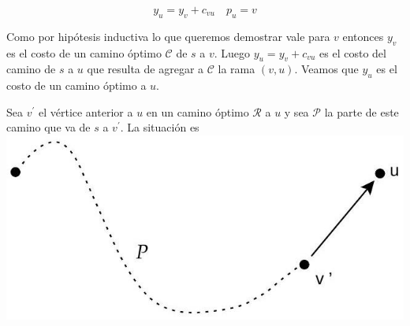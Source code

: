 \documentclass[10pt]{article}
\begin{document}
$$
y_{u}=y_{v}+c_{v u} \quad p_{u}=v
$$

Como por hipótesis inductiva lo que queremos demostrar vale para $v$ entonces $y_{v}$ es el costo de un camino óptimo $\mathcal{C}$ de $s$ a $v$. Luego $y_{u}=y_{v}+c_{v u}$ es el costo del camino de $s$ a $u$ que resulta de agregar a $\mathcal{C}$ la rama $(v, u)$. Veamos que $y_{u}$ es el costo de un camino óptimo a $u$.

Sea $v^{\prime}$ el vértice anterior a $u$ en un camino óptimo $\mathcal{R}$ a $u$ y sea $\mathcal{P}$ la parte de este camino que va de $s$ a $v^{\prime}$. La situación es\\
\includegraphics[max width=\textwidth, center]{2025_09_05_93c7c1835f249f70c0eeg-32(2)}
\end{document}
